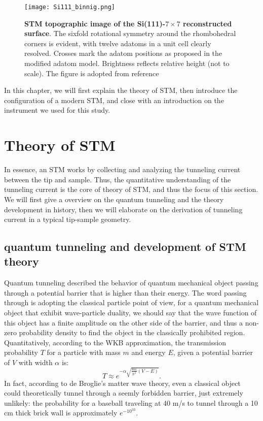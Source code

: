 \begin{figure}
	\centering
	\texttt{[image: Si111\_binnig.png]}
	\caption[\textbf{STM topographic image of the Si(111)-$7 \times 7$ reconstructed surface}]{\textbf{STM topographic image of the Si(111)-$7 \times 7$ reconstructed surface}. The sixfold rotational symmetry around the rhombohedral corners is evident, with twelve adatoms in a unit cell clearly resolved. Crosses mark the adatom positions as proposed in the modified adatom model. Brightness reflects relative height (not to scale). The figure is adopted from reference \cite{binnig77Reconstruction1983}}
	\label{figure:si111_binnig}
\end{figure}

In this chapter, we will first explain the theory of \ac{STM}, then introduce the configuration of a modern \ac{STM}, and close with an introduction on the instrument we used for this study. 

\section{Theory of STM}
In essence, an \ac{STM} works by collecting and analyzing the tunneling current between the tip and sample. Thus, the quantitative understanding of the tunneling current is the core of theory of \ac{STM}, and thus the focus of this section. We will first give a overview on the quantum tunneling and the theory development in history, then we will elaborate on the derivation of tunneling current in a typical tip-sample geometry.

\subsection{quantum tunneling and development of STM theory}
Quantum tunneling described the behavior of quantum mechanical object passing through a potential barrier that is higher than their energy. The word passing through is adopting the classical particle point of view, for a quantum mechanical object that exhibit wave-particle duality, we should say that the wave function of this object has a finite amplitude on the other side of the barrier, and thus a non-zero probability density to find the object in the classically prohibited region. Quantitatively, according to the WKB approximation, the transmission probability $T$ for a particle with mass $m$ and energy $E$, given a potential barrier of $V$ with width $\alpha$ is: 
\begin{equation}
	T \approx e^{-\alpha\sqrt{\frac{8m}{\hslash^2}(V-E)}}. 
\end{equation}
In fact, according to de Broglie's  matter wave theory, even a classical object could theoretically tunnel through a seemly forbidden barrier, just extremely unlikely: the probability for a baseball traveling at 40 m/s to tunnel through a 10 cm thick brick wall is approximately $e^{-10^{33}}$. 

